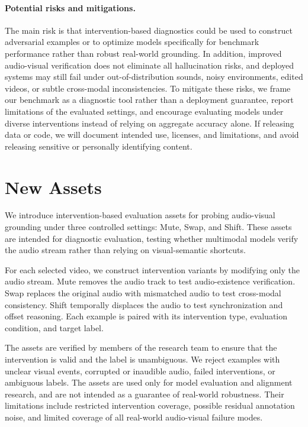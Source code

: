 \paragraph{Potential risks and mitigations.}
The main risk is that intervention-based diagnostics could be used to construct adversarial examples or to optimize models specifically for benchmark performance rather than robust real-world grounding. In addition, improved audio-visual verification does not eliminate all hallucination risks, and deployed systems may still fail under out-of-distribution sounds, noisy environments, edited videos, or subtle cross-modal inconsistencies. To mitigate these risks, we frame our benchmark as a diagnostic tool rather than a deployment guarantee, report limitations of the evaluated settings, and encourage evaluating models under diverse interventions instead of relying on aggregate accuracy alone. If releasing data or code, we will document intended use, licenses, and limitations, and avoid releasing sensitive or personally identifying content.

\section{New Assets}
\label{app:assets}

We introduce intervention-based evaluation assets for probing audio-visual grounding under three controlled settings: Mute, Swap, and Shift. These assets are intended for diagnostic evaluation, testing whether multimodal models verify the audio stream rather than relying on visual-semantic shortcuts.

For each selected video, we construct intervention variants by modifying only the audio stream. Mute removes the audio track to test audio-existence verification. Swap replaces the original audio with mismatched audio to test cross-modal consistency. Shift temporally displaces the audio to test synchronization and offset reasoning. Each example is paired with its intervention type, evaluation condition, and target label.

The assets are verified by members of the research team to ensure that the intervention is valid and the label is unambiguous. We reject examples with unclear visual events, corrupted or inaudible audio, failed interventions, or ambiguous labels. The assets are used only for model evaluation and alignment research, and are not intended as a guarantee of real-world robustness. Their limitations include restricted intervention coverage, possible residual annotation noise, and limited coverage of all real-world audio-visual failure modes.